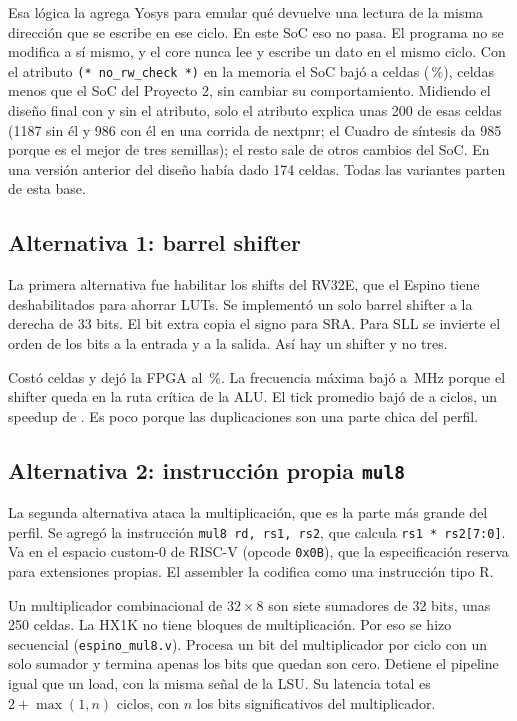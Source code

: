 \documentclass[11pt,letterpaper]{article}
\begin{document}
Esa lógica la agrega Yosys para emular qué devuelve una lectura de la misma dirección que se escribe
en ese ciclo. En este SoC eso no pasa. El programa no se modifica a sí mismo, y el core nunca lee y
escribe un dato en el mismo ciclo. Con el atributo \texttt{(* no\_rw\_check *)} en la memoria el SoC
bajó a \LCSw{} celdas (\LCPctSw\,\%), \AhorroRAM{} celdas menos que el SoC del Proyecto 2, sin cambiar su
comportamiento. Midiendo el diseño final con y sin el atributo, solo el atributo explica unas 200 de esas celdas
(1187 sin él y 986 con él en una corrida de nextpnr; el Cuadro de síntesis da 985 porque es el mejor de tres semillas); el resto sale de otros cambios del SoC. En una versión anterior del diseño
había dado 174 celdas. Todas las variantes parten de esta base.

\subsection{Alternativa 1: barrel shifter}

La primera alternativa fue habilitar los shifts del RV32E, que el Espino tiene deshabilitados para
ahorrar LUTs. Se implementó un solo barrel shifter a la derecha de 33 bits. El bit extra copia el signo
para SRA. Para SLL se invierte el orden de los bits a la entrada y a la salida. Así hay un shifter y
no tres.

Costó \CostoShift{} celdas y dejó la FPGA al \LCPctShift\,\%. La frecuencia máxima bajó a
\FmaxShift\,MHz porque el shifter queda en la ruta crítica de la ALU. El tick promedio bajó de
\CiclosPromSw{} a \CiclosPromShift{} ciclos, un speedup de \SpeedupShift. Es poco porque las
duplicaciones son una parte chica del perfil.

\subsection{Alternativa 2: instrucción propia \texttt{mul8}}

La segunda alternativa ataca la multiplicación, que es la parte más grande del perfil. Se agregó la
instrucción \texttt{mul8 rd, rs1, rs2}, que calcula \texttt{rs1 * rs2[7:0]}. Va en el espacio custom-0
de RISC-V (opcode \texttt{0x0B}), que la especificación reserva para extensiones propias. El
assembler la codifica como una instrucción tipo R.

Un multiplicador combinacional de $32\times 8$ son siete sumadores de 32 bits, unas 250 celdas. La
HX1K no tiene bloques de multiplicación. Por eso se hizo secuencial (\texttt{espino\_mul8.v}). Procesa un
bit del multiplicador por ciclo con un solo sumador y termina apenas los bits que quedan son cero.
Detiene el pipeline igual que un load, con la misma señal de la LSU. Su latencia total es
$2 + \max(1, n)$ ciclos, con $n$ los bits significativos del multiplicador.
\end{document}
